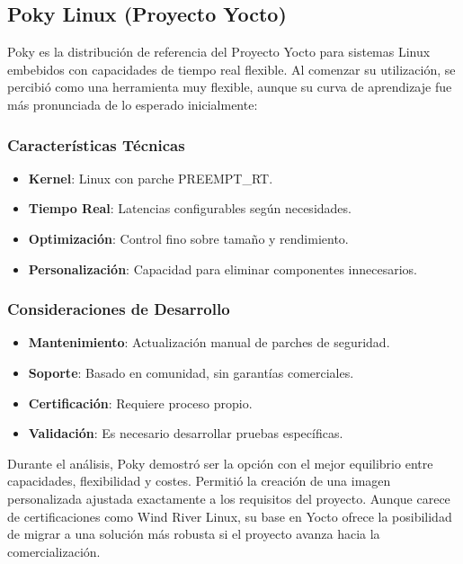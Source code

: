     \newpage
    \subsection{Poky Linux (Proyecto Yocto)}
        Poky es la distribución de referencia del Proyecto Yocto para sistemas Linux embebidos con capacidades de tiempo real flexible. Al comenzar su utilización, se percibió como una herramienta muy flexible, aunque su curva de aprendizaje fue más pronunciada de lo esperado inicialmente:

        \subsubsection{Características Técnicas}
            \begin{itemize}
                \item \textbf{Kernel}: Linux con parche PREEMPT\_RT.
                \item \textbf{Tiempo Real}: Latencias configurables según necesidades.
                \item \textbf{Optimización}: Control fino sobre tamaño y rendimiento.
                \item \textbf{Personalización}: Capacidad para eliminar componentes innecesarios.
            \end{itemize}

        \subsubsection{Consideraciones de Desarrollo}
            \begin{itemize}
                \item \textbf{Mantenimiento}: Actualización manual de parches de seguridad.
                \item \textbf{Soporte}: Basado en comunidad, sin garantías comerciales.
                \item \textbf{Certificación}: Requiere proceso propio.
                \item \textbf{Validación}: Es necesario desarrollar pruebas específicas.
            \end{itemize}

        Durante el análisis, Poky demostró ser la opción con el mejor equilibrio entre capacidades, flexibilidad y costes. Permitió la creación de una imagen personalizada ajustada exactamente a los requisitos del proyecto. Aunque carece de certificaciones como Wind River Linux, su base en Yocto ofrece la posibilidad de migrar a una solución más robusta si el proyecto avanza hacia la comercialización.

